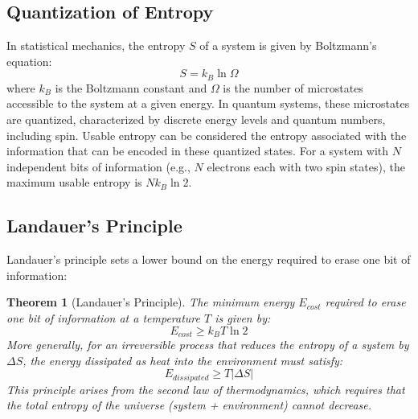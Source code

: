 \documentclass{article}
\newtheorem{theorem}{Theorem}
\begin{document}
	\subsection{Quantization of Entropy}
	In statistical mechanics, the entropy $S$ of a system is given by Boltzmann's equation:
	\begin{equation}
		S = k_B \ln \Omega
	\end{equation}
	where $k_B$ is the Boltzmann constant and $\Omega$ is the number of microstates accessible to the system at a given energy. In quantum systems, these microstates are quantized, characterized by discrete energy levels and quantum numbers, including spin. Usable entropy can be considered the entropy associated with the information that can be encoded in these quantized states. For a system with $N$ independent bits of information (e.g., $N$ electrons each with two spin states), the maximum usable entropy is $N k_B \ln 2$.
	
	\subsection{Landauer's Principle}
	Landauer's principle sets a lower bound on the energy required to erase one bit of information:
	\begin{theorem}[Landauer's Principle]
		The minimum energy $E_{cost}$ required to erase one bit of information at a temperature $T$ is given by:
		\begin{equation}
			E_{cost} \ge k_B T \ln 2
		\end{equation}
		More generally, for an irreversible process that reduces the entropy of a system by $\Delta S$, the energy dissipated as heat into the environment must satisfy:
		\begin{equation}
			E_{dissipated} \ge T |\Delta S|
		\end{equation}
		This principle arises from the second law of thermodynamics, which requires that the total entropy of the universe (system + environment) cannot decrease.
	\end{theorem}
\end{document}
